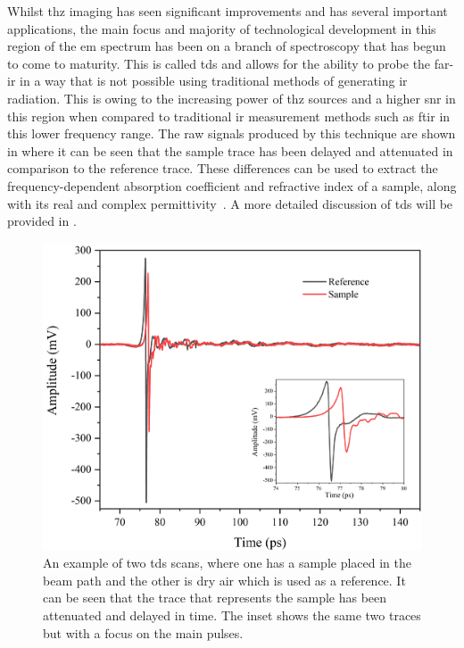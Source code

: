Whilst \acrshort{thz} imaging has seen significant improvements and has several important applications, the main focus and majority of technological development in this region of the \acrshort{em} spectrum has been on a branch of spectroscopy that has begun to come to maturity. This is called \acrfull{tds} and allows for the ability to probe the far\nobreakdash-\acrshort{ir} in a way that is not possible using traditional methods of generating \acrshort{ir} radiation. This is owing to the increasing power of \acrshort{thz} sources and a higher \acrfull{snr} in this region when compared to traditional \acrshort{ir} measurement methods such as \acrfull{ftir} in this lower frequency range. The raw signals produced by this technique are shown in  where it can be seen that the sample trace has been delayed and attenuated in comparison to the reference trace. These differences can be used to extract the frequency\nobreakdash-dependent absorption coefficient and refractive index of a sample, along with its real and complex permittivity~\cite{Burnett2016}. A more detailed discussion of \acrshort{tds} will be provided in .

\begin{figure}[t]
    \centering
    \includegraphics[scale=0.6]{Figures/Misc/Theory/TimeDomainFigureG.png}
    \captionsetup{font = footnotesize, justification = centering}
    \caption[A Sample and Reference Measurement in the Time Domain]{An example of two \acrshort{tds} scans, where one has a sample placed in the beam path and the other is dry air which is used as a reference. It can be seen that the trace that represents the sample has been attenuated and delayed in time. The inset shows the same two traces but with a focus on the main pulses.}
    \label{fig:exampletd}
\end{figure}

